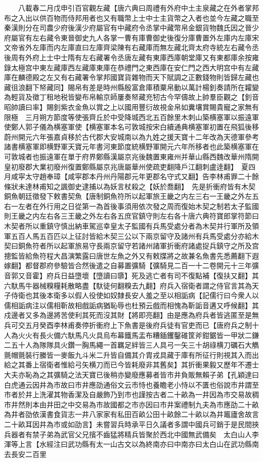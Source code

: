 　　八載春二月戊申引百官觀左藏【唐六典曰周禮有外府中土主泉藏之在外者掌邦布之入出以供百物而侍邦用者也又有職幣上士中士主貨幣之入者也並今左藏之職至秦漢則分在司農少府後漢少府屬官有中藏府令丞掌中藏幣帛金銀貨物魏氏因之晉少府屬官有左右藏令東晉御史九人各掌一曹有庫曹御史後復分庫曹置外左庫内左庫宋文帝省外左庫而内左庫直曰左庫齊梁陳有右藏庫而無左藏北齊太府寺統左右藏令丞後周有外府上士中士隋有左右藏署令丞唐左藏有東庫西庫朝堂庫又有東都庫余按雍錄太極宫中東左藏庫西左藏庫東庫在恭禮門之東西庫在安仁門之西大明宫中有左藏庫在麟德殿之左又有右藏署令掌邦國寶貨雜物而天下賦調之正數錢物則皆歸左藏也藏徂浪翻下帑藏同】賜帛有差是時州縣殷富倉庫積粟帛動以萬計楊釗奏請所在糶變為輕貨及徵丁租地税皆變布帛輸京師屢奏帑藏充牣古今罕儔故上帥羣臣觀之【釗音昭帥讀曰率】賜釗紫衣金魚以賞之上以國用豐衍故視金帛如糞壤賞賜貴寵之家無有限極　三月朔方節度等使張齊丘於中受降城西北五百餘里木刺山築横塞軍以振遠軍使鄭人郭子儀為横塞軍使【横塞軍本名可敦城按宋白續通典横塞軍初置在飛狐後移蔚州開元六年張嘉貞移於古代郡大安城南以為九姓之援天寶十二年改為天德軍參考諸書横塞軍即横野軍天寶元年書河東節度統横野軍開元六年所移者也此築横塞軍在可敦城者也振遠軍在單于府界鄭縣漢屬京兆後魏置東雍州并華山縣西魏改華州隋開皇初廢郡大業初廢州復置鄭縣屬京兆唐屬華州使疏吏翻降戶江翻刺盧逹翻】　夏四月咸寜太守趙奉璋【咸寜郡本丹州丹陽郡元年更郡名守式又翻】告李林甫罪二十餘條狀未達林甫知之諷御史逮捕以為妖言杖殺之【妖於喬翻】　先是折衝府皆有木契銅魚朝廷徵發下敕書契魚【唐制銅魚符所以起軍旅王畿之内左三右一王畿之外左五右一左者在外行用之日從第一為首後事須用依次發之周而復始木契之制若太子監國則王畿之内左右各三王畿之外左右各五庶官鎮守則左右各十唐六典符寶郎掌符節曰木契者所以重鎮守慎出納車駕巡幸皇太子監國有兵馬受處分者為木契并行軍所及領軍五百人馬五百匹以上征討皆給木契三公以下兩京留守及諸州有兵馬受處分亦給木契曰銅魚符者所以起軍旅易守長兩京留守若諸州諸軍折衝府諸處捉兵鎮守之所及宫摠監皆給魚符程大昌演繁露曰唐世左魚之外又有敕牒將之故兼名魚書先悉薦翻下遐嫁翻】都督郡府參驗皆合然後遣之自募置彍騎【彍騎見二百一十二卷開元十三年彍音郭又音霍】府兵日益墮壞【墮讀曰隳】死及逃亡者有司不復點補【復扶又翻】其六馱馬牛器械糗糧耗散略盡【馱徒何翻糗去九翻】府兵入宿衛者謂之侍官言其為天子侍衛也其後本衛多以假人役使如奴隸長安人羞之至以相詬病【記儒行曰今衆人以儒相詬病注以儒相靳故相戲詬病猶恥辱也杜預云戲而相愧為靳詬音遘又呼候翻】其戍邊者又多為邊將苦使利其死而沒其財【將即亮翻】由是應為府兵者皆逃匿至是無兵可交五月癸酉李林甫奏停折衝府上下魚書是後府兵徒有官吏而已【唐府兵之制十人為火火有長火備六馱馬凡火具烏布幕鐵馬盂布糟鍤钁鑿碓筐斧鉗鋸皆一甲狀二鎌二五十人為隊隊具火鑽一胸馬繩一首羈足絆皆三人具弓一矢三十胡祿横刀礪石大觹氈帽氈裝行縢皆一麥飯九斗米二升皆自備其介胄戎具藏于庫有所征行則視其入而出給之其番上宿衛者惟給弓矢横刀而已今皆耗廢非其舊矣】其折衝果毅又歷年不遷士大夫亦恥為之其彍騎之法天寶已後稍亦變廢應募者皆市井負販無賴子弟【孔穎達曰白虎通云因井為市故曰市井應劭通俗文云市恃也養瞻老小恃以不匱也俗說市井謂至市者於井上洗濯其物香潔及自嚴飾乃到市也謹按古者二十畝為一井因為市交易故稠市井然則本由井田之中交易為市故國都之市亦因曰市井案禮制九夫為市應劭二十畝為井者劭依漢書食貨志一井八家家有私田百畝公田十畝餘二十畝以為井竈廬舍故言二十畝耳因井為市或如劭言】未嘗習兵時承平日久議者多謂中國兵可銷于是民間挾兵器者有禁子弟為武官父兄擯不齒猛將精兵皆聚於西北中國無武備矣　太白山人李渾等上言【水經注曰武功縣有太一山古文以為終南亦曰中南亦曰太白山在武功縣南去長安二百里